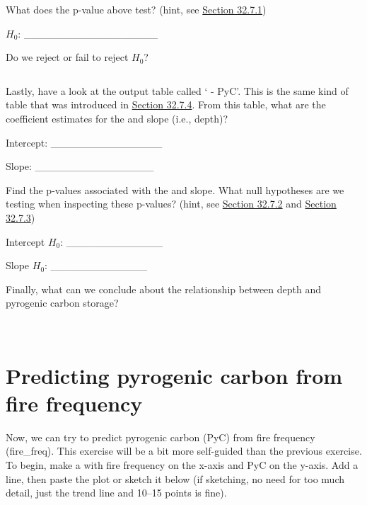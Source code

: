 \documentclass[
  openany]{krantz}
\begin{document}
\begin{verbatim}
\end{verbatim}

What  does the p-value above test? (hint, see \protect\hyperlink{overall-model-significance}{Section 32.7.1})

\(H_{0}\): \_\_\_\_\_\_\_\_\_\_\_\_\_\_\_\_\_\_

Do we reject or fail to reject \(H_{0}\)?

\begin{verbatim}
\end{verbatim}

Lastly, have a look at the output table called ` - PyC'.
This is the same kind of table that was introduced in \protect\hyperlink{simple-regression-output}{Section 32.7.4}.
From this table, what are the coefficient estimates for the  and slope (i.e., depth)?

Intercept: \_\_\_\_\_\_\_\_\_\_\_\_\_\_\_

Slope: \_\_\_\_\_\_\_\_\_\_\_\_\_\_\_\_

Find the p-values associated with the  and slope.
What null hypotheses are we testing when inspecting these p-values? (hint, see \protect\hyperlink{significance-of-the-intercept}{Section 32.7.2} and \protect\hyperlink{significance-of-the-slope}{Section 32.7.3})

Intercept \(H_{0}\): \_\_\_\_\_\_\_\_\_\_\_\_\_

Slope \(H_{0}\): \_\_\_\_\_\_\_\_\_\_\_\_\_

Finally, what can we conclude about the relationship between depth and pyrogenic carbon storage?

\begin{verbatim}


\end{verbatim}

\hypertarget{predicting-pyrogenic-carbon-from-fire-frequency}{%
\section{Predicting pyrogenic carbon from fire frequency}\label{predicting-pyrogenic-carbon-from-fire-frequency}}

Now, we can try to predict pyrogenic carbon (PyC) from fire frequency (fire\_freq).
This exercise will be a bit more self-guided than the previous exercise.
To begin, make a  with fire frequency on the x-axis and PyC on the y-axis.
Add a  line, then paste the plot or sketch it below (if sketching, no need for too much detail, just the trend line and 10--15 points is fine).
\end{document}
